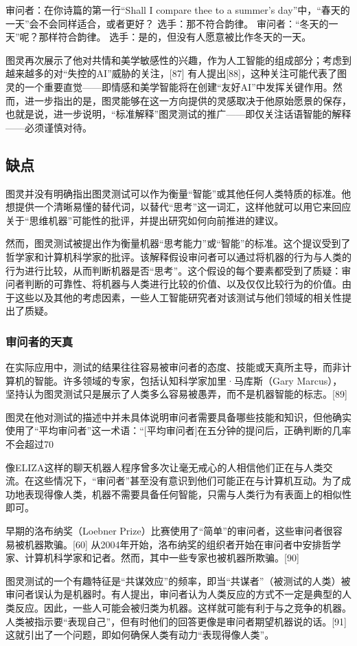 审问者：在你诗篇的第一行“Shall I compare thee to a summer's day”中，“春天的一天”会不会同样适合，或者更好？  
选手：那不符合韵律。  
审问者：“冬天的一天”呢？那样符合韵律。  
选手：是的，但没有人愿意被比作冬天的一天。  

图灵再次展示了他对共情和美学敏感性的兴趣，作为人工智能的组成部分；考虑到越来越多的对“失控的AI”威胁的关注，[87] 有人提出[88]，这种关注可能代表了图灵的一个重要直觉——即情感和美学智能将在创建“友好AI”中发挥关键作用。然而，进一步指出的是，图灵能够在这一方向提供的灵感取决于他原始愿景的保存，也就是说，进一步说明，“标准解释”图灵测试的推广——即仅关注话语智能的解释——必须谨慎对待。
\subsection{缺点}
图灵并没有明确指出图灵测试可以作为衡量“智能”或其他任何人类特质的标准。他想提供一个清晰易懂的替代词，以替代“思考”这一词汇，这样他就可以用它来回应关于“思维机器”可能性的批评，并提出研究如何向前推进的建议。

然而，图灵测试被提出作为衡量机器“思考能力”或“智能”的标准。这个提议受到了哲学家和计算机科学家的批评。该解释假设审问者可以通过将机器的行为与人类的行为进行比较，从而判断机器是否“思考”。这个假设的每个要素都受到了质疑：审问者判断的可靠性、将机器与人类进行比较的价值、以及仅仅比较行为的价值。由于这些以及其他的考虑因素，一些人工智能研究者对该测试与他们领域的相关性提出了质疑。
\subsubsection{审问者的天真}
在实际应用中，测试的结果往往容易被审问者的态度、技能或天真所主导，而非计算机的智能。许多领域的专家，包括认知科学家加里·马库斯（Gary Marcus），坚持认为图灵测试只是展示了人类多么容易被愚弄，而不是机器智能的标志。[89]

图灵在他对测试的描述中并未具体说明审问者需要具备哪些技能和知识，但他确实使用了“平均审问者”这一术语：“[平均审问者]在五分钟的提问后，正确判断的几率不会超过70%

像ELIZA这样的聊天机器人程序曾多次让毫无戒心的人相信他们正在与人类交流。在这些情况下，“审问者”甚至没有意识到他们可能正在与计算机互动。为了成功地表现得像人类，机器不需要具备任何智能，只需与人类行为有表面上的相似性即可。

早期的洛布纳奖（Loebner Prize）比赛使用了“简单”的审问者，这些审问者很容易被机器欺骗。[60] 从2004年开始，洛布纳奖的组织者开始在审问者中安排哲学家、计算机科学家和记者。然而，其中一些专家也被机器所欺骗。[90]

图灵测试的一个有趣特征是“共谋效应”的频率，即当“共谋者”（被测试的人类）被审问者误认为是机器时。有人提出，审问者认为人类反应的方式不一定是典型的人类反应。因此，一些人可能会被归类为机器。这样就可能有利于与之竞争的机器。人类被指示要“表现自己”，但有时他们的回答更像是审问者期望机器说的话。[91] 这就引出了一个问题，即如何确保人类有动力“表现得像人类”。
